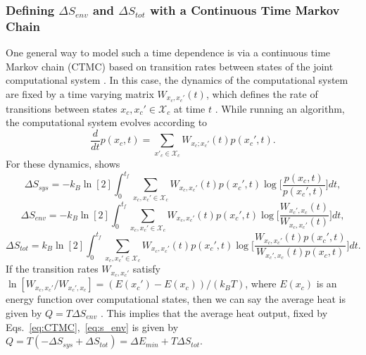 \documentclass[12pt,onecolumn, margin=1in]{IEEEtran}
\begin{document}
\subsubsection{Defining $\Delta S_{env}$ and $\Delta S_{tot}$ with a Continuous Time Markov Chain}

One general way to model such a time dependence is via a continuous time Markov chain (CTMC) based on transition rates between states of the joint computational system \cite{Wolpert2019, Manzano2024, KolchinskyWolpert2021, Owen_2019, esposito2010}. In this case, the dynamics of the computational system are fixed by a time varying matrix $W_{x_c,x_c'}(t)$, which defines the rate of transitions between states $x_c, x_c'\in \mathcal{X}_c$ at time $t$ \cite{Wolpert2019, KolchinskyWolpert2021}. 
While running an algorithm, the computational system evolves according to
\begin{equation}
    \label{eq:CTMC}
    \frac{d}{dt} p(x_c,t) = \sum_{x'_c \in \mathcal{X}_c} W_{x_c;x_c'}(t) p(x_c',t).
\end{equation}
For these dynamics, \cite{esposito2010} shows
\begin{equation}
    \Delta S_{sys} = -k_B \ln[2] \int^{t_f}_0 \sum_{x_c,x_c' \in \mathcal{X}_c} W_{x_c,x_c'}(t)p(x_c', t) \log \bigg[ \frac{p(x_c,t)}{p(x_c',t)} \bigg]dt,
\end{equation}
\begin{equation}
    \label{eq:s_env}
    \Delta S_{env} = - k_B \ln[2] \int^{t_f}_0\sum_{x_c,x_c'\in \mathcal{X}_c} W_{x_c,x_c'}(t) p(x_c', t) \log \bigg[ \frac{W_{x_c',x_c}(t)}{W_{x_c,x_c'}(t)} \bigg] dt,
\end{equation}
\begin{equation}
    \Delta S_{tot} = k_B \ln[2] \int^{t_f}_0\sum_{x_c,x_c'\in \mathcal{X}_c} W_{x_c,x_c'}(t) p(x_c', t) \log \bigg[ \frac{W_{x_c,x_c'}(t)p(x_c',t)}{W_{x_c',x_c}(t) p(x_c,t)} \bigg] dt.
\end{equation}
If the transition rates $W_{x_c,x_c'}$ satisfy $\ln[W_{x_c,x_c'}/W_{x_c',x_c}] = (E(x_c') - E(x_c))/(k_BT)$, where $E(x_c)$ is an energy function over computational states, then we can say the average heat is given by $Q = T \Delta S_{env}$ \cite[p.30]{Wolpert2019} \cite{Seifert_2012}. This implies that the average heat output, fixed by Eqs.~\eqref{eq:CTMC},~\eqref{eq:s_env} is given by $Q = T(-\Delta S_{sys} + \Delta S_{tot}) = \Delta E_{min} +T\Delta S_{tot}$. 
\end{document}
